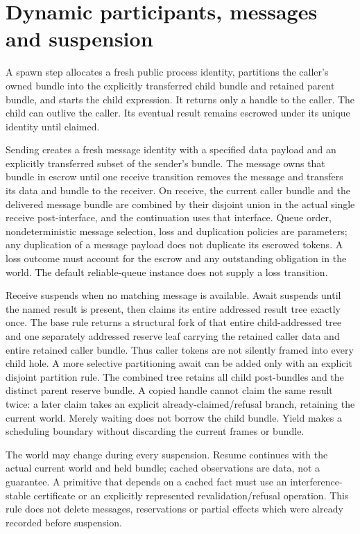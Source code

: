 \documentclass[11pt]{article}
\begin{document}
\section{Dynamic participants, messages and suspension}
A spawn step allocates a fresh public process identity, partitions the caller's owned bundle into the explicitly transferred child bundle and retained parent bundle, and starts the child expression. It returns only a handle to the caller. The child can outlive the caller. Its eventual result remains escrowed under its unique identity until claimed.

Sending creates a fresh message identity with a specified data payload and an explicitly transferred subset of the sender's bundle. The message owns that bundle in escrow until one receive transition removes the message and transfers its data and bundle to the receiver. On receive, the current caller bundle and the delivered message bundle are combined by their disjoint union in the actual single receive post-interface, and the continuation uses that interface. Queue order, nondeterministic message selection, loss and duplication policies are parameters; any duplication of a message payload does not duplicate its escrowed tokens. A loss outcome must account for the escrow and any outstanding obligation in the world. The default reliable-queue instance does not supply a loss transition.

Receive suspends when no matching message is available. Await suspends until the named result is present, then claims its entire addressed result tree exactly once. The base rule returns a structural fork of that entire child-addressed tree and one separately addressed reserve leaf carrying the retained caller data and entire retained caller bundle. Thus caller tokens are not silently framed into every child hole. A more selective partitioning await can be added only with an explicit disjoint partition rule. The combined tree retains all child post-bundles and the distinct parent reserve bundle. A copied handle cannot claim the same result twice: a later claim takes an explicit already-claimed/refusal branch, retaining the current world. Merely waiting does not borrow the child bundle. Yield makes a scheduling boundary without discarding the current frames or bundle.

The world may change during every suspension. Resume continues with the actual current world and held bundle; cached observations are data, not a guarantee. A primitive that depends on a cached fact must use an interference-stable certificate or an explicitly represented revalidation/refusal operation. This rule does not delete messages, reservations or partial effects which were already recorded before suspension.
\end{document}

